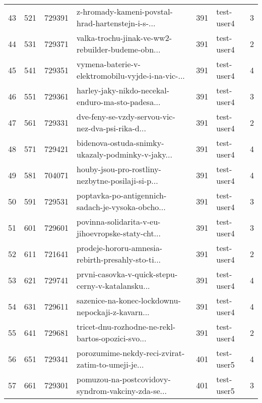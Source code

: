 \begin{tabular}{lrrlrlr}
43   &        521 &   729391 &  z-hromady-kameni-povstal-hrad-hartenstejn-i-s-... &      391 &                   test-user4 &               3 \\
44   &        531 &   729371 &  valka-trochu-jinak-ve-ww2-rebuilder-budeme-obn... &      391 &                   test-user4 &               2 \\
45   &        541 &   729351 &  vymena-baterie-v-elektromobilu-vyjde-i-na-vic-... &      391 &                   test-user4 &               4 \\
46   &        551 &   729361 &  harley-jaky-nikdo-necekal-enduro-ma-sto-padesa... &      391 &                   test-user4 &               3 \\
47   &        561 &   729331 &  dve-feny-se-vzdy-servou-vic-nez-dva-psi-rika-d... &      391 &                   test-user4 &               2 \\
48   &        571 &   729421 &  bidenova-ostuda-snimky-ukazaly-podminky-v-jaky... &      391 &                   test-user4 &               4 \\
49   &        581 &   704071 &  houby-jsou-pro-rostliny-nezbytne-posilaji-si-p... &      391 &                   test-user4 &               4 \\
50   &        591 &   729531 &  poptavka-po-antigennich-sadach-je-vysoka-obcho... &      391 &                   test-user4 &               3 \\
51   &        601 &   729601 &  povinna-solidarita-v-eu-jihoevropske-staty-cht... &      391 &                   test-user4 &               3 \\
52   &        611 &   721641 &  prodeje-hororu-amnesia-rebirth-presahly-sto-ti... &      391 &                   test-user4 &               2 \\
53   &        621 &   729741 &  prvni-casovka-v-quick-stepu-cerny-v-katalansku... &      391 &                   test-user4 &               4 \\
54   &        631 &   729611 &  sazenice-na-konec-lockdownu-nepockaji-z-kavarn... &      391 &                   test-user4 &               4 \\
55   &        641 &   729681 &  tricet-dnu-rozhodne-ne-rekl-bartos-opozici-svo... &      391 &                   test-user4 &               2 \\
56   &        651 &   729341 &  porozumime-nekdy-reci-zvirat-zatim-to-umeji-je... &      401 &                   test-user5 &               4 \\
57   &        661 &   729301 &  pomuzou-na-postcovidovy-syndrom-vakciny-zda-se... &      401 &                   test-user5 &               3 \\

\end{tabular}
